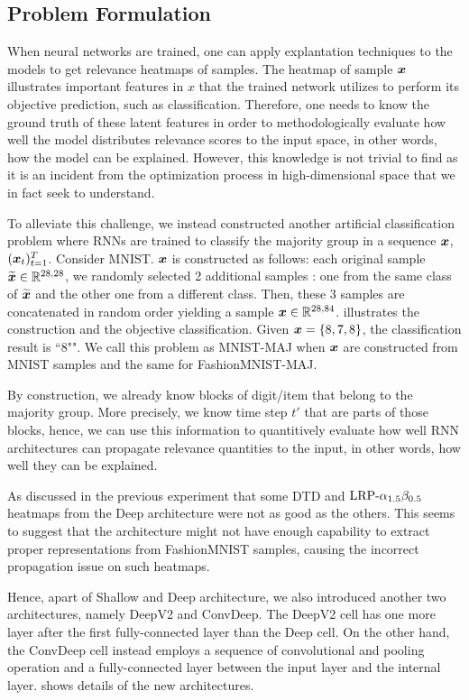 \subsection{Problem Formulation} \label{sec:exp2_prob_formulate}
When neural networks are trained, one can apply explantation techniques to the models to get relevance heatmaps of samples.  The heatmap of sample $\boldsymbol{x}$ illustrates important features in $x$ that the trained network utilizes to perform its objective prediction,  such as classification.  Therefore, one needs to know the ground truth of these latent features in order to methodologically evaluate how well the model distributes  relevance scores to the input space, in other words, how the model can be explained. However,  this knowledge is not trivial to find as it is an incident from the optimization process in high-dimensional space that we in fact seek to understand.

To alleviate this challenge, we instead  constructed another artificial classification problem where RNNs are trained to classify  the majority group in a sequence $\boldsymbol{x}$, $(\boldsymbol{x}_t )_{t=1}^{T}$. Consider MNIST. $\boldsymbol{x}$ is constructed as follows: each original sample $\widetilde{\boldsymbol{x}} \in \mathbb{R}^{28,28}$, we randomly selected 2 additional samples : one from the same class of $\widetilde{\boldsymbol{x}}$ and the other one from a different class. Then, these 3 samples are concatenated in random order yielding a sample $\boldsymbol{x} \in \mathbb{R}^{28,84}$.  \addfigure{\ref{fig:artificial_problem_3digits}} illustrates the construction and the objective classification. Given $\boldsymbol{x} = \{ 8, 7, 8\}$, the classification result is ``8"".  We call this problem as MNIST-MAJ when $\boldsymbol{x}$ are constructed from MNIST samples and the same for FashionMNIST-MAJ.

By construction, we already know blocks of digit/item that belong to the majority group. More precisely, we know time step $t'$ that are parts of those blocks, hence, we can use this information to  quantitively evaluate  how well RNN architectures can propagate relevance quantities to the input, in other words, how well they can be explained.


As discussed in the previous experiment that some DTD and $\text{LRP-}\alpha_{1.5}\beta_{0.5}$ heatmaps from the Deep architecture were not as good as the others. This seems to suggest that the architecture might not have enough capability to extract proper representations from FashionMNIST samples, causing the incorrect propagation issue on such heatmaps. 

Hence, apart of Shallow and Deep architecture, we also introduced another two architectures, namely DeepV2 and ConvDeep. The DeepV2 cell has one more layer after the first fully-connected layer than the Deep cell. On the other hand, the ConvDeep cell instead employs a sequence of convolutional and pooling operation and a fully-connected layer between the input layer and the internal layer. \addfigure{\ref{fig:deep_conv_arch}} shows details of the new architectures. 


